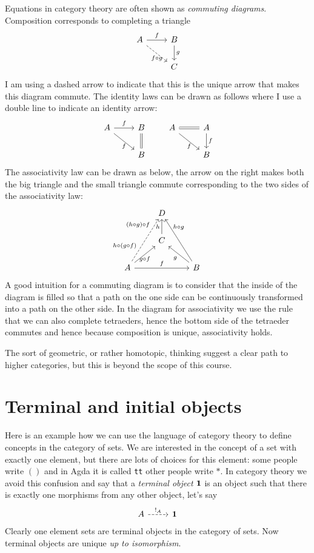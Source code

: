 Equations in category theory are often shown as \emph{commuting diagrams}. Composition corresponds to completing a triangle
\[\begin{tikzcd}
A \arrow[rd, dashrightarrow,"f\circ g" below] \arrow[r,"f"] & B \arrow[d,"g"]\\
& C
\end{tikzcd}
\]
I am using a dashed arrow to indicate that this is the unique arrow that makes this diagram commute. 
The identity laws can be drawn as follows where I use a double line to indicate an identity arrow:
\[\begin{tikzcd}
A \arrow[rd,"f" below] \arrow[r,"f"] & B \arrow[d,equal]\\
& B
\end{tikzcd}
\qquad
\begin{tikzcd}
A \arrow[rd,"f" below] \arrow[r,equal] & A \arrow[d,"f"]\\
& B
\end{tikzcd}
\]
The associativity law can be drawn as below, the arrow on the right makes both the big triangle and the small triangle commute corresponding to the two sides of the associativity law:
\[\begin{tikzcd}
    & D  &\\
   & C  \arrow[u,"h"] & \\
A \arrow[ur,"g \circ f" below]\arrow[rr,"f"] 
\arrow[uur,dashrightarrow,"h \circ(g \circ f)" near start,"(h\circ g)\circ f" near end] &     & B \arrow[ul,"g"]\arrow[uul,"h \circ g" above=10]
\end{tikzcd}
\]
A good intuition for a commuting diagram is to consider that the inside of the diagram is filled so that a path on the one side can be continuously transformed into a path on the other side. In the diagram for associativity we use the rule that we can also complete tetraeders, hence the bottom side of the tetraeder commutes and hence because composition is unique, associativity holds.

The sort of geometric, or rather homotopic, thinking suggest a clear path to higher categories, but this is beyond the scope of this course.

\section{Terminal and initial objects}
\label{sec:term-init-objects}

Here is an example how we can use the language of category theory to define concepts in the category of sets. We are interested in the concept of a set with exactly one element, but there are lots of choices for this element: some people write $()$ and in Agda it is called \texttt{tt} other people write $*$. In category theory we avoid this confusion and say that a \emph{terminal object} $\bf{1}$ is an object such that there is exactly one morphisms from any other object, let's say 
\[\begin{tikzcd}
  A \arrow[r, dashrightarrow, "!_A"] & \bf{1}
\end{tikzcd}\]
Clearly one element sets are terminal objects in the category of sets. Now terminal objects are unique \emph{up to isomorphism}. 

